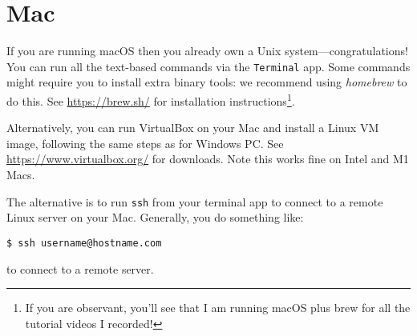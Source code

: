 \documentclass{article}
\begin{document}
\section*{Mac}

If you are running macOS then you already own a Unix system---congratulations!
You can run all the text-based commands via the \texttt{Terminal}
app. Some commands might require you to install extra binary tools:
we recommend using \textit{homebrew} to do this. See \url{https://brew.sh/} for installation instructions\footnote{If
you are observant, you'll see that I am running macOS plus brew for all
the tutorial videos I recorded!}.

Alternatively, you can run VirtualBox on your Mac and install a
Linux VM image, following the same steps as for Windows PC.
See \url{https://www.virtualbox.org/} for downloads. Note this works fine
on Intel and M1 Macs.

The alternative is to run \texttt{ssh} from your terminal app
to connect to a remote Linux server on your Mac. Generally, you
do something like:

\begin{lstlisting}[style=BashInputStyle]
  $ ssh username@hostname.com
\end{lstlisting}

to connect to a remote server.
\end{document}
